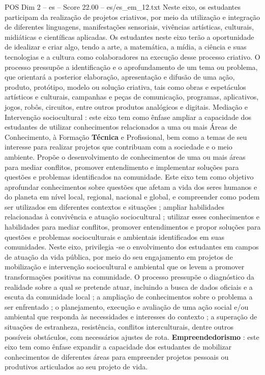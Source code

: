 \begin{textsample}{POS Dim 2 – es – Score 22.00 – es/es\_em\_12.txt}
Neste eixo, os estudantes participam da realização de projetos criativos, por meio da utilização e integração de diferentes linguagens, manifestações sensoriais, vivências artísticas, culturais, midiáticas e científicas aplicadas.
Os estudantes neste eixo terão a oportunidade de idealizar e criar algo, tendo a arte, a matemática, a mídia, a ciência e suas tecnologias e a cultura como colaboradores na execução desse processo criativo.
O processo pressupõe a identificação e o aprofundamento de um tema ou problema, que orientará a posterior elaboração, apresentação e difusão de uma ação, produto, protótipo, modelo ou solução criativa, tais como obras e espetáculos artísticos e culturais, campanhas e peças de comunicação, programas, aplicativos, jogos, robôs, circuitos, entre outros produtos analógicos e digitais.
Mediação e Intervenção sociocultural : este eixo tem como ênfase ampliar a capacidade dos estudantes de utilizar conhecimentos relacionados a uma ou mais Áreas de Conhecimento, à Formação \textbf{Técnica} e Profissional, bem como a temas de seu interesse para realizar projetos que contribuam com a sociedade e o meio ambiente.
Propõe o desenvolvimento de conhecimentos de uma ou mais áreas para mediar conflitos, promover entendimento e implementar soluções para questões e problemas identificados na comunidade.
Este eixo tem como objetivo aprofundar conhecimentos sobre questões que afetam a vida dos seres humanos e do planeta em nível local, regional, nacional e global, e compreender como podem ser utilizados em diferentes contextos e situações ; ampliar habilidades relacionadas à convivência e atuação sociocultural ; utilizar esses conhecimentos e habilidades para mediar conflitos, promover entendimentos e propor soluções para questões e problemas socioculturais e ambientais identificados em suas comunidades.
Neste eixo, privilegia -se o envolvimento dos estudantes em campos de atuação da vida pública, por meio do seu engajamento em projetos de mobilização e intervenção sociocultural e ambiental que os levem a promover transformações positivas na comunidade.
O processo pressupõe o diagnóstico da realidade sobre a qual se pretende atuar, incluindo a busca de dados oficiais e a escuta da comunidade local ; a ampliação de conhecimentos sobre o problema a ser enfrentado ; o planejamento, execução e avaliação de uma ação social e/ou ambiental que responda às necessidades e interesses do contexto ; a superação de situações de estranheza, resistência, conflitos interculturais, dentre outros possíveis obstáculos, com necessários ajustes de rota. \textbf{Empreendedorismo} : este eixo tem como ênfase expandir a capacidade dos estudantes de mobilizar conhecimentos de diferentes áreas para empreender projetos pessoais ou produtivos articulados ao seu projeto de vida.

\end{textsample}
